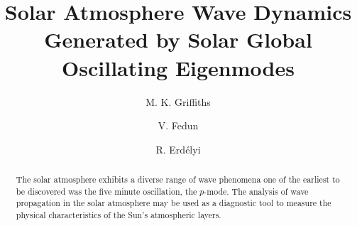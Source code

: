 \documentclass[preprint,authoryear,12pt]{elsarticle}
\begin{document}
\begin{frontmatter}





\title{Solar Atmosphere Wave Dynamics Generated by Solar Global  Oscillating Eigenmodes}


\author{M. K. Griffiths}
\address{1 Solar Physics and Space Plasma Research Centre ($SP^{2}RC$), School of Mathematics and 
Statistics, University of Sheffield, Hicks Building, Hounsfield Road, S7 3RH, UK}
\address{2 Corporate Information and Computing Services, The University of Sheffield, 10-12
Brunswick Street, Sheffeld, S10 2FN, UK.}

\author{V. Fedun}
\address{Department of Automatic Control and Systems Engineering, The University of Sheffield, Mappin Street, Sheffield, S1 3JD, UK}

\author{R. Erd\'{e}lyi}
\address{Solar Physics and Space Plasma Research Centre ($SP^{2}RC$), School of Mathematics and 
Statistics, University of Sheffield, Hicks Building, Hounsfield Road, S7 3RH, UK}
\address{5 Department of Astronomy, E\"Łotv\"Łos Lor\'and University, Budapest, Hungary}


\begin{abstract}
The solar atmosphere exhibits a diverse range of wave phenomena one of the earliest to be discovered was the five minute 
oscillation, the $p$-mode.  The analysis of wave propagation in the solar atmosphere may be used as a diagnostic tool to 
measure the physical characteristics of the  Sun's atmospheric layers. 


\end{abstract}
\end{frontmatter}
\end{document}
